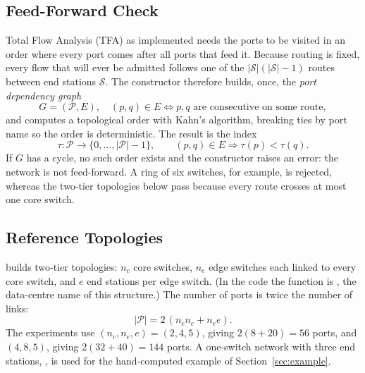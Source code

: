 \documentclass[9pt,a4paper,twocolumn,twoside]{tau-class/tau}
\newcommand{\src}[1]{../../src/tsn_gate/#1}
\providecommand{\secref}[1]{Section~\ref{#1}}
\begin{document}
        \begin{code}
            }
            \caption{Shortest-path routing with ECMP tie-breaking (\texttt{model.py}).}
            \label{lst:route}
        \end{code}

    \subsection{Feed-Forward Check}

        Total Flow Analysis (TFA) as implemented needs the ports to be visited in an order where every port comes after all ports that feed it. Because routing is fixed, every flow that will ever be admitted follows one of the $|\mathcal{S}|(|\mathcal{S}|-1)$ routes between end stations $\mathcal{S}$. The constructor therefore builds, once, the \emph{port dependency graph}
        \begin{equation}\label{eq:depgraph}
            G = (\mathcal{P}, E), \quad (p,q) \in E \iff p, q \mbox{ are consecutive on some route},
        \end{equation}
        and computes a topological order with Kahn's algorithm, breaking ties by port name so the order is deterministic. The result is the index
        \begin{equation}\label{eq:topo}
            \tau : \mathcal{P} \to \{0, \dots, |\mathcal{P}|-1\}, \qquad (p,q) \in E \Rightarrow \tau(p) < \tau(q).
        \end{equation}
        If $G$ has a cycle, no such order exists and the constructor raises an error: the network is not feed-forward. A ring of six switches, for example, is rejected, whereas the two-tier topologies below pass because every route crosses at most one core switch.

    \subsection{Reference Topologies}

         builds two-tier topologies: $n_c$ core switches, $n_e$ edge switches each linked to every core switch, and $e$ end stations per edge switch. (In the code the function is , the data-centre name of this structure.) The number of ports is twice the number of links:
        \begin{equation}\label{eq:portcount}
            |\mathcal{P}| = 2\,(n_c n_e + n_e e).
        \end{equation}
        The experiments use $(n_c, n_e, e) = (2, 4, 5)$, giving $2(8 + 20) = 56$ ports, and $(4, 8, 5)$, giving $2(32 + 40) = 144$ ports. A one-switch network with three end stations, , is used for the hand-computed example of \secref{sec:example}.
\end{document}
